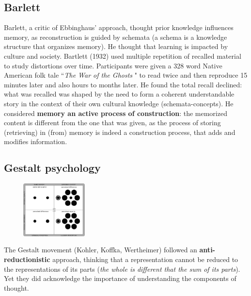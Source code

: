 \subsection{Barlett}
Barlett, a critic of Ebbinghaus' approach, thought prior knowledge influences memory, as reconstruction is guided by schemata (a schema is a knowledge structure that organizes memory). He thought that learning is impacted by culture and society.
Bartlett (1932) used multiple repetition of recalled material to study distortions over time. Participants were given a 328 word Native American folk tale ``\textit{The War of the Ghosts} \notet" to read twice and then reproduce 15 minutes later and also hours to months later. He found the total recall declined: what was recalled was shaped by the need to form a coherent understandable story in the context of their own cultural knowledge (schemata-concepts). He considered \textbf{memory an active process of construction}: the memorized content is different from the one that was given, as the process of storing (retrieving) in (from) memory is indeed a construction process, that adds and modifies information.


\subsection{Gestalt psychology}
\begin{figure}
  \centering
  \includegraphics[width=0.3\textwidth]{images/gestalt_2.png}
  \caption{}
  \label{fig:gestalt_2}
\end{figure}

The Gestalt movement (Kohler, Koffka, Wertheimer) followed an 
\textbf{anti-reductionistic} approach, thinking that a representation cannot be reduced to the representations of its parts (\textit{the whole is different that the sum of its parts}). Yet they did acknowledge the importance of understanding the components of thought.\\


